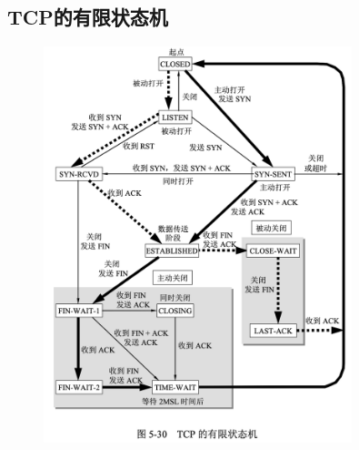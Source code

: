\documentclass[cs4size,a4paper,10pt]{ctexart}
\begin{document}
	\subsection{TCP的有限状态机}
	\begin{figure}[H]
		\centering
		\includegraphics[width=0.8\textwidth]{img/5.30}
	\end{figure}
\end{document}

